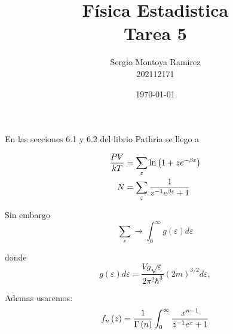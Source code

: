 \documentclass{report}
\title{\Huge{Física Estadistica}\\Tarea 5}
\author{\huge{Sergio Montoya Ramirez}\\ 202112171}
\date{\today}
\begin{document}
\maketitle
\newpage%
\tableofcontents
\pagebreak

\chapter{}

\section{}

En las secciones 6.1 y 6.2 del librio Pathria se llego a

\begin{align}
  \frac{PV}{kT} &= \sum_{\varepsilon}\ln\left(1 + ze^{-\beta\varepsilon}\right)\label{eq:8-1}\\
  N &= \sum_{\varepsilon} \frac{1}{z^{-1}e^{\beta\varepsilon} + 1}\label{eq:8-2}
\end{align}

Sin embargo
\[
  \sum_{\varepsilon} \to \int_0^\infty g(\varepsilon) d\varepsilon
\]

donde
\[
  g(\varepsilon) d\varepsilon = \frac{V g \sqrt{\varepsilon}}{2\pi^2 \hbar^3} (2m)^{3/2} d\varepsilon,
\] 

Ademas usaremos:
\[
  f_{n}\left(z\right) = \frac{1}{\Gamma\left(n\right)}\int_0^\infty \frac{x^{n - 1}}{z^{-1}e^{x} + 1}
\]
\end{document}
